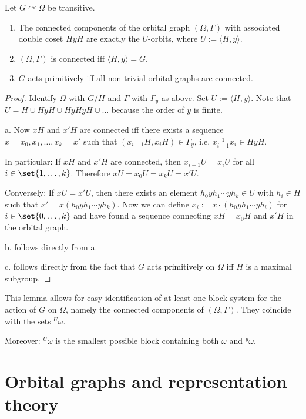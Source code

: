 \documentclass[fontsize=11pt,fleqn,a4paper]{scrartcl}
\begin{document}
\begin{corollary}
Let $G \curvearrowright \Omega$ be transitive.

\begin{enumerate}
\item The connected components of the orbital graph $(\Omega,\Gamma)$ with associated double coset $HyH$ are exactly the $U$-orbits, where $U:=\langle H,y\rangle$.
\item $(\Omega,\Gamma)$ is connected iff $\langle H,y\rangle = G$.
\item $G$ acts primitively iff all non-trivial orbital graphs are connected.
\end{enumerate}
\end{corollary}
\begin{proof}
Identify $\Omega$ with $G/H$ and $\Gamma$ with $\Gamma_y$ as above. Set $U:=\langle H,y\rangle$. Note that $U=H\cup HyH\cup HyHyH\cup\ldots$ because the order of $y$ is finite.

\medbreak
a. Now $xH$ and $x'H$ are connected iff there exists a sequence $x=x_0,x_1,\ldots,x_k=x'$ such that $(x_{i-1}H,x_i H)\in\Gamma_y$, i.e. $x_{i-1}^{-1} x_i \in HyH$.

In particular: If $xH$ and $x'H$ are connected, then $x_{i-1}U = x_i U$ for all $i\in\set{1,\ldots,k}$. Therefore $xU=x_0U = x_k U = x'U$.

Conversely: If $xU=x'U$, then there exists an element $h_0 y h_1 \cdots y h_k \in U$ with $h_i\in H$ such that $x' = x(h_0 y h_1 \cdots y h_k)$. Now we can define $x_i := x \cdot (h_0 y h_1 \cdots y h_i)$ for $i\in\set{0,\ldots,k}$ and have found a sequence connecting $xH=x_0H$ and $x'H$ in the orbital graph.

\medbreak
b. follows directly from a.

\medbreak
c. follows directly from the fact that $G$ acts primitively on $\Omega$ iff $H$ is a maximal subgroup.
\end{proof}

\begin{remark}
This lemma allows for easy identification of at least one block system for the action of $G$ on $\Omega$, namely the connected components of $(\Omega,\Gamma)$. They coincide with the sets ${^U \omega}$.

Moreover: ${^U \omega}$ is the smallest possible block containing both $\omega$ and ${^y \omega}$.
\end{remark}


\section{Orbital graphs and representation theory}
\end{document}
